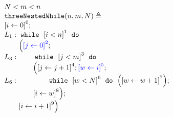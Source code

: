     { \footnotesize
    \begin{figure}
    \centering
    \begin{subfigure}{.3\textwidth}
      \[
        \begin{array}{l}
            N < m < n\\
            \kw{threeNestedWhile}(n, m, N) \triangleq \\
            \clabel{ \assign{i}{0} }^{0} ; \\
                L_1: \ewhile ~ \clabel{i < n}^{1} ~ \edo ~ \\
                \qquad \Big(
                 \highlight{\clabel{\assign{j}{0}}^{2}} ;\\
                 L_3:  \qquad \ewhile ~ \clabel{j < m}^{3} ~ \edo ~ \\
                 \qquad \qquad \Big(
                  \clabel{\assign{j}{j+1}}^{4};
                  \highlight{\clabel{\assign{w}{i}}^{5}};\\
                  L_6:  \qquad \qquad \ewhile ~ \clabel{w < N}^{6} ~ \edo ~
                  \Big(
                    \clabel{\assign{w}{w + 1}}^{7}
                      \Big); \\
                      \qquad \qquad \clabel{\assign{i}{w}}^{8}
                      \Big); \\
                      \qquad \clabel{\assign{i}{i+1}}^{9}
                  \Big)
            \end{array}
        \]
    \end{subfigure}
    \begin{subfigure}{.3\textwidth}
        \begin{centering}
        \begin{tikzpicture}[scale=\textwidth/15cm,samples=200]
    \end{tikzpicture}
    \caption{}
    \end{centering}
    \end{subfigure}
    \begin{subfigure}{.5\textwidth}
\end{subfigure}
\end{figure}}
